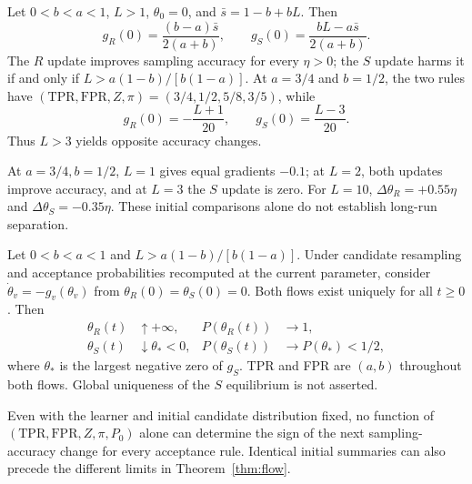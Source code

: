 \begin{proposition}
\label{prop:separation}
Let $0<b<a<1$, $L>1$, $\theta_0=0$, and $\bar s=1-b+bL$. Then
\begin{equation}
 g_R(0)=\frac{(b-a)\bar s}{2(a+b)},\qquad
 g_S(0)=\frac{bL-a\bar s}{2(a+b)}.
 \label{eq:general-initial}
\end{equation}
The $R$ update improves sampling accuracy for every $\eta>0$; the $S$ update
harms it if and only if $L>a(1-b)/[b(1-a)]$.
At $a=3/4$ and $b=1/2$, the two rules have
$(\mathrm{TPR},\mathrm{FPR},Z,\pi)=(3/4,1/2,5/8,3/5)$, while
\begin{equation}
 g_R(0)=-\frac{L+1}{20},\qquad g_S(0)=\frac{L-3}{20}.
 \label{eq:initial-gradients}
\end{equation}
Thus $L>3$ yields opposite accuracy changes.
\end{proposition}

\begin{remark}
At $a=3/4,b=1/2$, $L=1$ gives equal gradients $-0.1$; at $L=2$,
both updates improve accuracy, and at $L=3$ the $S$ update is zero.
For $L=10$, $\Delta\theta_R=+0.55\eta$ and $\Delta\theta_S=-0.35\eta$.
These initial comparisons alone do not establish long-run separation.
\end{remark}

\begin{theorem}
\label{thm:flow}
Let $0<b<a<1$ and $L>a(1-b)/[b(1-a)]$. Under candidate resampling and
acceptance probabilities recomputed at the current parameter, consider
$\dot\theta_v=-g_v(\theta_v)$ from $\theta_R(0)=\theta_S(0)=0$.
Both flows exist uniquely for all $t\geq0$. Then
\begin{equation}
 \begin{aligned}
 \theta_R(t)&\uparrow+\infty,&P(\theta_R(t))&\longrightarrow1,\\
 \theta_S(t)&\downarrow\theta_*<0,&P(\theta_S(t))&\longrightarrow P(\theta_*)<1/2,
 \end{aligned}
 \label{eq:flow-limits}
\end{equation}
where $\theta_*$ is the largest negative zero of $g_S$. TPR and FPR are
$(a,b)$ throughout both flows. Global uniqueness of the $S$ equilibrium is
not asserted.
\end{theorem}

\begin{corollary}
\label{cor:nonidentification}
Even with the learner and initial candidate distribution fixed, no function
of $(\mathrm{TPR},\mathrm{FPR},Z,\pi,P_0)$ alone can determine the sign of
the next sampling-accuracy change for every acceptance rule. Identical
initial summaries can also precede the different limits in
Theorem~\ref{thm:flow}.
\end{corollary}


